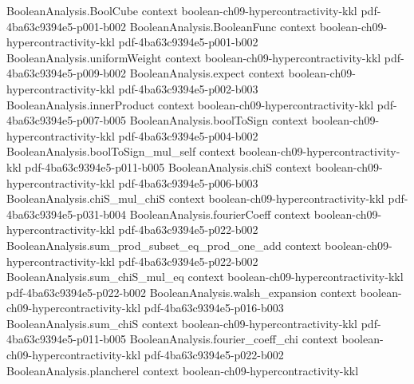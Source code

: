 \begin{theorem}
\label{BooleanAnalysis.Hypercontractivity.noise_operator_duality}
\leanok
{}
\proofstep
  {BooleanAnalysis.BoolCube}
  {context}
  {boolean-ch09-hypercontractivity-kkl}
  {pdf-4ba63c9394e5-p001-b002}
\proofstep
  {BooleanAnalysis.BooleanFunc}
  {context}
  {boolean-ch09-hypercontractivity-kkl}
  {pdf-4ba63c9394e5-p001-b002}
\proofstep
  {BooleanAnalysis.uniformWeight}
  {context}
  {boolean-ch09-hypercontractivity-kkl}
  {pdf-4ba63c9394e5-p009-b002}
\proofstep
  {BooleanAnalysis.expect}
  {context}
  {boolean-ch09-hypercontractivity-kkl}
  {pdf-4ba63c9394e5-p002-b003}
\proofstep
  {BooleanAnalysis.innerProduct}
  {context}
  {boolean-ch09-hypercontractivity-kkl}
  {pdf-4ba63c9394e5-p007-b005}
\proofstep
  {BooleanAnalysis.boolToSign}
  {context}
  {boolean-ch09-hypercontractivity-kkl}
  {pdf-4ba63c9394e5-p004-b002}
\proofstep
  {BooleanAnalysis.boolToSign_mul_self}
  {context}
  {boolean-ch09-hypercontractivity-kkl}
  {pdf-4ba63c9394e5-p011-b005}
\proofstep
  {BooleanAnalysis.chiS}
  {context}
  {boolean-ch09-hypercontractivity-kkl}
  {pdf-4ba63c9394e5-p006-b003}
\proofstep
  {BooleanAnalysis.chiS_mul_chiS}
  {context}
  {boolean-ch09-hypercontractivity-kkl}
  {pdf-4ba63c9394e5-p031-b004}
\proofstep
  {BooleanAnalysis.fourierCoeff}
  {context}
  {boolean-ch09-hypercontractivity-kkl}
  {pdf-4ba63c9394e5-p022-b002}
\proofstep
  {BooleanAnalysis.sum_prod_subset_eq_prod_one_add}
  {context}
  {boolean-ch09-hypercontractivity-kkl}
  {pdf-4ba63c9394e5-p022-b002}
\proofstep
  {BooleanAnalysis.sum_chiS_mul_eq}
  {context}
  {boolean-ch09-hypercontractivity-kkl}
  {pdf-4ba63c9394e5-p022-b002}
\proofstep
  {BooleanAnalysis.walsh_expansion}
  {context}
  {boolean-ch09-hypercontractivity-kkl}
  {pdf-4ba63c9394e5-p016-b003}
\proofstep
  {BooleanAnalysis.sum_chiS}
  {context}
  {boolean-ch09-hypercontractivity-kkl}
  {pdf-4ba63c9394e5-p011-b005}
\proofstep
  {BooleanAnalysis.fourier_coeff_chi}
  {context}
  {boolean-ch09-hypercontractivity-kkl}
  {pdf-4ba63c9394e5-p022-b002}
\proofstep
  {BooleanAnalysis.plancherel}
  {context}
  {boolean-ch09-hypercontractivity-kkl}

\end{theorem}

